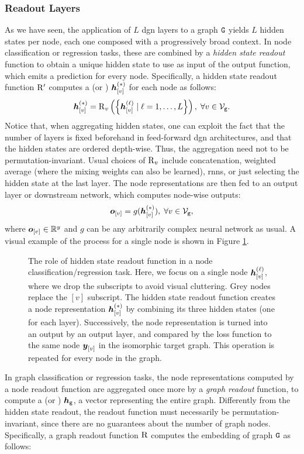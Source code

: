 \subsubsection{Readout Layers}
As we have seen, the application of $L$ \gls{dgn} layers to a graph $\GraphU{G}$ yields $L$ hidden states per node, each one composed with a progressively broad context. In node classification or regression tasks, these are combined by a \emph{hidden state readout} function to obtain a unique hidden state to use as input of the output function, which emits a prediction for every node. Specifically, a hidden state readout function $\mathrm{R'}$ computes a  (or ) $\StateVector{v}{*}$ for each node as follows:
$$\StateVector{v}{*} = \Op{R}_{v}\Par{\Set{\StateVector{v}{\ell} \mid \ell = 1, \ldots, L}},\;  \forall v \in \Nodes{g}. $$
Notice that, when aggregating hidden states, one can exploit the fact that the number of layers is fixed beforehand in feed-forward \gls{dgn} architectures, and that the hidden states are ordered depth-wise. Thus, the aggregation need not to be permutation-invariant. Usual choices of $\operatorname{R}_{v}$ include concatenation, weighted average (where the mixing weights can also be learned), \gls{rnn}s, or just selecting the hidden state at the last layer. The node representations are then fed to an output layer or downstream network, which computes node-wise outputs:
$$\Elem{o}{v} = g(\StateVector{v}{*}),\; \forall v \in \Nodes{g},$$
where $\Elem{o}{v} \in \Real^y$ and $g$ can be any arbitrarily complex neural network as usual. A visual example of the process for a single node is shown in Figure \ref{fig:node-readout}.
\begin{figure*}[h!]
    \centering
    \resizebox{.6\textwidth}{!}{}
    \caption{The role of hidden state readout function in a node classification/regression task. Here, we focus on a single node $\StateVector{v}{\ell}$, where we drop the subscripts to avoid visual cluttering. Grey nodes replace the $[v]$ subscript. The hidden state readout function creates a node representation $\StateVector{v}{*}$ by combining its three hidden states (one for each layer). Successively, the node representation is turned into an output by an output layer, and compared by the loss function to the same node $\Elem{y}{v}$ in the isomorphic target graph. This operation is repeated for every node in the graph.}
    \label{fig:node-readout}
\end{figure*}
In graph classification or regression tasks, the node representations computed by a node readout function are aggregated once more by a \emph{graph readout} function, to compute a  (or ) $\GraphRepr{g}$, \ie a vector representing the entire graph. Differently from the hidden state readout, the readout function must necessarily be permutation-invariant, since there are no guarantees about the number of graph nodes. Specifically, a graph readout function $\mathrm{R}$ computes the embedding of graph $\GraphU{g}$ as follows:
